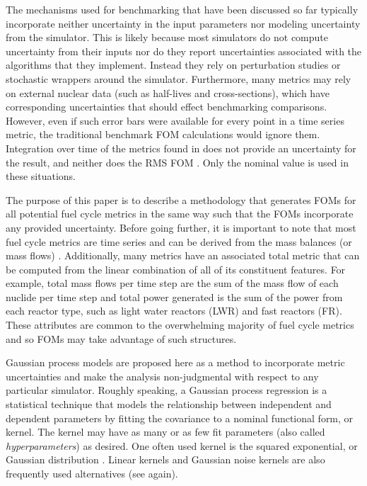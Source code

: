 The mechanisms used for benchmarking that have been discussed so far typically
incorporate neither uncertainty in the input parameters nor 
modeling uncertainty from the simulator.
This is likely because most simulators do not compute uncertainty from their
inputs nor do they report uncertainties associated with the algorithms that 
they implement. 
Instead they rely on perturbation studies or stochastic wrappers around 
the simulator. Furthermore, many metrics may rely on external nuclear 
data (such as half-lives and cross-sections), which have corresponding 
uncertainties that should effect benchmarking comparisons. 
However, even if such error bars were available for
every point in a time series metric, the traditional benchmark FOM 
calculations would ignore them. Integration over time of the metrics found in
\cite{wigeland2014nuclear} does not provide an uncertainty for the result,
and neither does the RMS FOM 
\cite{mouginot2015ofcb}. Only the nominal value is used in these situations.

The purpose of this paper is to describe a methodology that generates FOMs
for all potential fuel cycle metrics in the same way such that the FOMs 
incorporate any provided uncertainty. 
Before going further, it is important to note that 
most fuel cycle 
metrics are time series and can be derived from the mass balances (or 
mass flows) \cite{wilson2011comparing,guerin2009benchmark,piet2011assessment,wigeland2014nuclear}. 
Additionally, many metrics have an associated total metric that can be 
computed from the linear combination of all of its constituent features. 
For example, total mass flows per time step are the sum of the mass flow 
of each nuclide per time step
and total power generated is the sum of the power from each reactor type, 
such as light water reactors (LWR) and fast reactors (FR). These attributes 
are common to the overwhelming majority of fuel cycle metrics and so FOMs
may take advantage of such structures.

Gaussian process models are proposed here as a method to incorporate 
metric uncertainties and make the analysis non-judgmental with respect to 
any particular
simulator. Roughly speaking, a Gaussian process regression is a 
statistical technique
that models the relationship between independent and dependent parameters
by fitting the covariance to a nominal functional form, or kernel.
The kernel may have as many or as few fit parameters (also called 
\emph{hyperparameters}) as desired. One often used kernel is the squared 
exponential, or Gaussian distribution \cite{rasmussen2006gaussian,hodlr}. 
Linear kernels and Gaussian noise kernels are also frequently used 
alternatives (see \cite{rasmussen2006gaussian,hodlr} again). 

